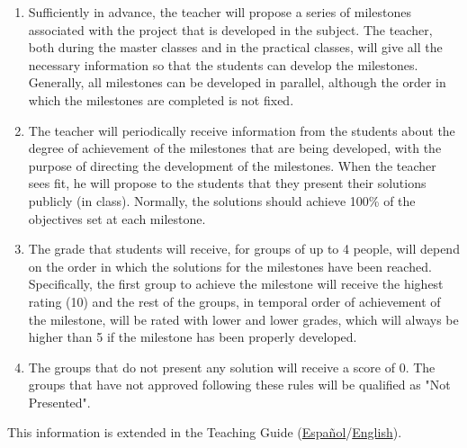 \begin{enumerate}
\item Sufficiently in advance, the teacher will propose a series of
  milestones associated with the project that is developed in the
  subject. The teacher, both during the master classes and in the
  practical classes, will give all the necessary information so that
  the students can develop the milestones. Generally, all milestones
  can be developed in parallel, although the order in which the
  milestones are completed is not fixed.
\item The teacher will periodically receive information from the
  students about the degree of achievement of the milestones that are
  being developed, with the purpose of directing the development of
  the milestones. When the teacher sees fit, he will propose to the
  students that they present their solutions publicly (in
  class). Normally, the solutions should achieve 100\% of the
  objectives set at each milestone.
\item The grade that students will receive, for groups of up to 4
  people, will depend on the order in which the solutions for the
  milestones have been reached. Specifically, the first group to
  achieve the milestone will receive the highest rating (10) and the
  rest of the groups, in temporal order of achievement of the
  milestone, will be rated with lower and lower grades, which will
  always be higher than 5 if the milestone has been properly
  developed.
\item The groups that do not present any solution will receive a score
  of 0. The groups that have not approved following these rules will
  be qualified as "Not Presented".
\end{enumerate}

This information is extended in the Teaching Guide
(\href{https://portafirma.ual.es/pfirma/downloadReport/file?idDocument=4Jp82utmug&idRequest=QY36GYcOZQ}{Español}/\href{https://portafirma.ual.es/pfirma/downloadReport/file?idDocument=Zcmom6qigD&idRequest=xXgueuk9oD}{English}).
